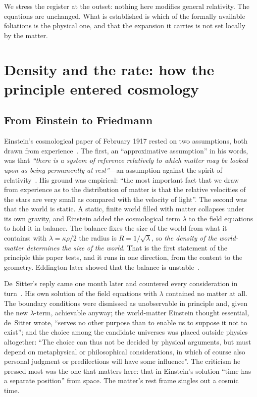 \documentclass[aps,prd,reprint,amsmath,amssymb,superscriptaddress]{revtex4-2}
\begin{document}
We stress the register at the outset: nothing here modifies general relativity. The equations are unchanged. What is established is which of the formally available foliations is the physical one, and that the expansion it carries is not set locally by the matter.

\section{Density and the rate: how the principle entered cosmology}\label{sec:principle}

\subsection{From Einstein to Friedmann}\label{sec:history}

Einstein's cosmological paper of February 1917 rested on two assumptions, both drawn from experience~\cite{Einstein1917}. The first, an ``approximative assumption'' in his words, was that \emph{``there is a system of reference relatively to which matter may be looked upon as being permanently at rest''}---an assumption against the spirit of relativity~\cite{JanzenEinsteinCosmology}. His ground was empirical: ``the most important fact that we draw from experience as to the distribution of matter is that the relative velocities of the stars are very small as compared with the velocity of light''. The second was that the world is static. A static, finite world filled with matter collapses under its own gravity, and Einstein added the cosmological term $\lambda$ to the field equations to hold it in balance. The balance fixes the size of the world from what it contains: with $\lambda=\kappa\rho/2$ the radius is $R=1/\sqrt{\lambda}$, so \emph{the density of the world-matter determines the size of the world}. That is the first statement of the principle this paper tests, and it runs in one direction, from the content to the geometry. Eddington later showed that the balance is unstable~\cite{Eddington1930}.

De~Sitter's reply came one month later and countered every consideration in turn~\cite{deSitter1917}. His own solution of the field equations with $\lambda$ contained no matter at all. The boundary conditions were dismissed as unobservable in principle and, given the new $\lambda$-term, achievable anyway; the world-matter Einstein thought essential, de~Sitter wrote, ``serves no other purpose than to enable us to suppose it not to exist''; and the choice among the candidate universes was placed outside physics altogether: ``The choice can thus not be decided by physical arguments, but must depend on metaphysical or philosophical considerations, in which of course also personal judgment or predilections will have some influence''. The criticism he pressed most was the one that matters here: that in Einstein's solution ``time has a separate position'' from space. The matter's rest frame singles out a cosmic time.
\end{document}
